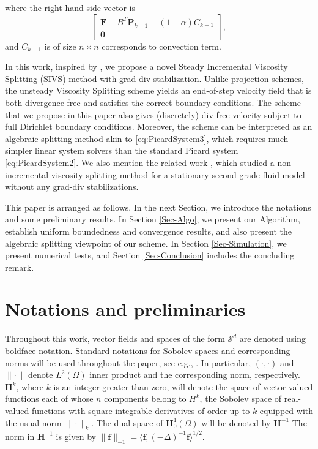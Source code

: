 \documentclass[3p]{elsarticle}
\def\V#1{\mathbf{#1}}
\newcommand{\DY}[1]{{\color{black}{#1}}}
\begin{document}
where the right-hand-side vector is 
\begin{equation}
    \label{eq:PicardSystem5}
\begin{bmatrix} \V{F} - B^T \V{P}_{k-1} - (1-\alpha) C_{k-1} \\ \V{0} \end{bmatrix},
\end{equation}
and $C_{k-1}$ is of size $n \times n$ corresponds to convection term. 

In this work, inspired by \cite{Yak2023}, we propose a novel Steady Incremental Viscosity Splitting (SIVS) method with grad-div stabilization. Unlike projection schemes, the unsteady Viscosity Splitting scheme \cite{Yak2023} yields an end-of-step velocity field that is both divergence-free and satisfies the correct boundary conditions. The scheme that we propose in this paper also gives (discretely) div-free velocity subject to full Dirichlet boundary conditions. Moreover, the scheme can be interpreted as an algebraic splitting method akin to \eqref{eq:PicardSystem3}, which requires much simpler linear system solvers than the standard Picard system \eqref{eq:PicardSystem2}. We also mention the related work \cite{10.1063/5.0195184}, which studied a non-incremental viscosity splitting method for a stationary second-grade fluid model without any grad-div stabilizations.

This paper is arranged as follows. In the next Section, we introduce the notations and some preliminary results. In Section \ref{Sec-Algo}, we present our Algorithm, establish uniform boundedness and convergence results, and also present the algebraic splitting viewpoint of our scheme. In Section \ref{Sec-Simulation}, we present numerical tests, and Section \ref{Sec-Conclusion} includes the concluding remark.

\section{Notations and preliminaries}\label{Notations}
Throughout this work, vector fields and spaces of the form $\mathcal{S}^d$ are denoted using boldface notation.
\noindent Standard notations for Sobolev spaces and corresponding norms will be used throughout the paper, see e.g., \cite{Ada1975}. In particular, $(\cdot,\cdot)$ and $\|\cdot \|$ denote $L^2(\Omega)$ inner product and the corresponding norm, respectively. $\V{H}^{k}$, where $k$ is an integer greater than zero, will denote the space of vector-valued functions each of whose $n$ components belong to $H^k$, the Sobolev space of real-valued functions with square integrable derivatives of order up to $k$ equipped with the usual norm $\|\cdot\|_k$. The dual space of $\V{H}^{1}_0(\Omega)$ will be denoted by $\V{H}^{-1}$ \DY{and the duality pairing between these two spaces is denoted by $\langle \cdot,\cdot \rangle$.} The norm in 
$\V{H}^{-1}$ is given by $\|\V{f} \|_{-1} = \langle \V{f}, (-\Delta )^{-1}\V{f} \rangle^{1/2}.$
\end{document}
